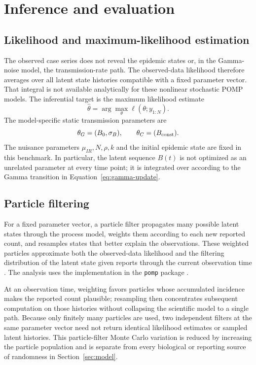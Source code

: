 \section{Inference and evaluation}
\label{sec:method}

\subsection{Likelihood and maximum-likelihood estimation}

The observed case series does not reveal the epidemic states or, in the
Gamma-noise model, the transmission-rate path.  The observed-data likelihood
therefore averages over all latent state histories compatible with a fixed
parameter vector.  That integral is not available analytically for these
nonlinear stochastic POMP models.  The inferential target is the maximum
likelihood estimate
\begin{equation}
\widehat{\theta}
=
\arg\max_{\theta}\ell(\theta;y_{1:N}).
\label{eq:mle}
\end{equation}
The model-specific static transmission parameters are
\[
\theta_G=(B_0,\sigma_B),
\qquad
\theta_C=(B_{\mathrm{const}}).
\]
The nuisance parameters \(\mu_{IR},N,\rho,k\) and the initial epidemic state
are fixed in this benchmark.  In particular, the latent sequence \(B(t)\) is
not optimized as an unrelated parameter at every time point; it is integrated
over according to the Gamma transition in Equation~\ref{eq:gamma-update}.

\subsection{Particle filtering}

For a fixed parameter vector, a particle filter propagates many possible
latent states through the process model, weights them according to each new
reported count, and resamples states that better explain the observations.
These weighted particles approximate both the observed-data likelihood and
the filtering distribution of the latent state given reports through the
current observation time \citep{gordon1993particle,king2016pomp}.  The analysis
uses the implementation in the \texttt{pomp} package
\citep{king2025pomp64}.

At an observation time, weighting favors particles whose accumulated
incidence makes the reported count plausible; resampling then concentrates
subsequent computation on those histories without collapsing the scientific
model to a single path.  Because only finitely many particles are used, two
independent filters at the same parameter vector need not return identical
likelihood estimates or sampled latent histories.  This particle-filter Monte Carlo
variation is reduced by increasing the particle population and is separate
from every biological or reporting source of randomness in Section~\ref{sec:model}.

